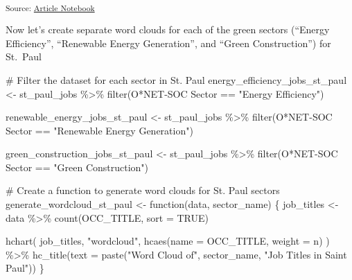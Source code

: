 \documentclass[
  letterpaper,
  DIV=11,
  numbers=noendperiod]{scrartcl}
\newenvironment{Shaded}{\begin{snugshade}}{\end{snugshade}}
\newcommand{\AttributeTok}[1]{\textcolor[rgb]{0.40,0.45,0.13}{#1}}
\newcommand{\CommentTok}[1]{\textcolor[rgb]{0.37,0.37,0.37}{#1}}
\newcommand{\ConstantTok}[1]{\textcolor[rgb]{0.56,0.35,0.01}{#1}}
\newcommand{\ControlFlowTok}[1]{\textcolor[rgb]{0.00,0.23,0.31}{#1}}
\newcommand{\FunctionTok}[1]{\textcolor[rgb]{0.28,0.35,0.67}{#1}}
\newcommand{\NormalTok}[1]{\textcolor[rgb]{0.00,0.23,0.31}{#1}}
\newcommand{\OtherTok}[1]{\textcolor[rgb]{0.00,0.23,0.31}{#1}}
\newcommand{\SpecialCharTok}[1]{\textcolor[rgb]{0.37,0.37,0.37}{#1}}
\newcommand{\StringTok}[1]{\textcolor[rgb]{0.13,0.47,0.30}{#1}}
\begin{document}
\textsubscript{Source:
\href{https://beeckcenter.github.io/climate-equity-workforce/index-preview.html}{Article
Notebook}}

Now let's create separate word clouds for each of the green sectors
(``Energy Efficiency'', ``Renewable Energy Generation'', and ``Green
Construction'') for St.~Paul

\begin{Shaded}
\begin{Highlighting}[]
\CommentTok{\# Filter the dataset for each sector in St. Paul}
\NormalTok{energy\_efficiency\_jobs\_st\_paul }\OtherTok{\textless{}{-}}\NormalTok{ st\_paul\_jobs }\SpecialCharTok{\%\textgreater{}\%}
  \FunctionTok{filter}\NormalTok{(}\StringTok{\textasciigrave{}}\AttributeTok{O*NET{-}SOC Sector}\StringTok{\textasciigrave{}} \SpecialCharTok{==} \StringTok{"Energy Efficiency"}\NormalTok{)}

\NormalTok{renewable\_energy\_jobs\_st\_paul }\OtherTok{\textless{}{-}}\NormalTok{ st\_paul\_jobs }\SpecialCharTok{\%\textgreater{}\%}
  \FunctionTok{filter}\NormalTok{(}\StringTok{\textasciigrave{}}\AttributeTok{O*NET{-}SOC Sector}\StringTok{\textasciigrave{}} \SpecialCharTok{==} \StringTok{"Renewable Energy Generation"}\NormalTok{)}

\NormalTok{green\_construction\_jobs\_st\_paul }\OtherTok{\textless{}{-}}\NormalTok{ st\_paul\_jobs }\SpecialCharTok{\%\textgreater{}\%}
  \FunctionTok{filter}\NormalTok{(}\StringTok{\textasciigrave{}}\AttributeTok{O*NET{-}SOC Sector}\StringTok{\textasciigrave{}} \SpecialCharTok{==} \StringTok{"Green Construction"}\NormalTok{)}

\CommentTok{\# Create a function to generate word clouds for St. Paul sectors}
\NormalTok{generate\_wordcloud\_st\_paul }\OtherTok{\textless{}{-}} \ControlFlowTok{function}\NormalTok{(data, sector\_name) \{}
\NormalTok{  job\_titles }\OtherTok{\textless{}{-}}\NormalTok{ data }\SpecialCharTok{\%\textgreater{}\%}
    \FunctionTok{count}\NormalTok{(OCC\_TITLE, }\AttributeTok{sort =} \ConstantTok{TRUE}\NormalTok{)}
  
  \FunctionTok{hchart}\NormalTok{(}
\NormalTok{    job\_titles, }
    \StringTok{"wordcloud"}\NormalTok{, }
    \FunctionTok{hcaes}\NormalTok{(}\AttributeTok{name =}\NormalTok{ OCC\_TITLE, }\AttributeTok{weight =}\NormalTok{ n)}
\NormalTok{  ) }\SpecialCharTok{\%\textgreater{}\%}
    \FunctionTok{hc\_title}\NormalTok{(}\AttributeTok{text =} \FunctionTok{paste}\NormalTok{(}\StringTok{"Word Cloud of"}\NormalTok{, sector\_name, }\StringTok{"Job Titles in Saint Paul"}\NormalTok{))}
\NormalTok{\}}


\end{Highlighting}
\end{Shaded}
\end{document}
